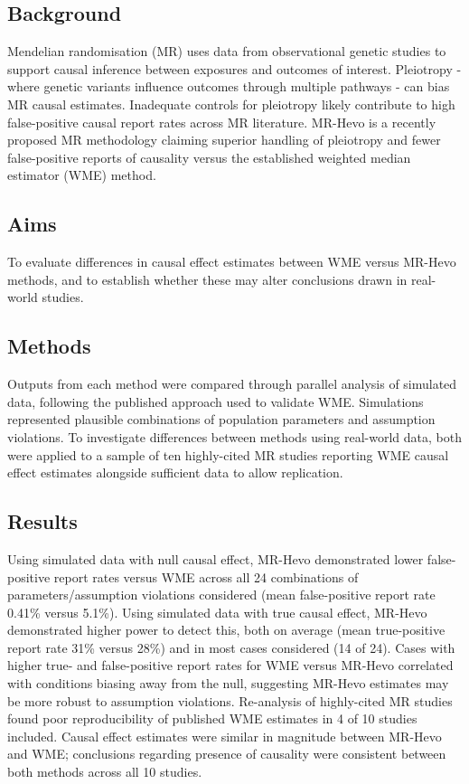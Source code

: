 \documentclass[
]{article}
\begin{document}
\subsection{Background}\label{background}

Mendelian randomisation (MR) uses data from observational genetic studies to support causal inference between exposures and outcomes of interest. Pleiotropy - where genetic variants influence outcomes through multiple pathways - can bias MR causal estimates. Inadequate controls for pleiotropy likely contribute to high false-positive causal report rates across MR literature. MR-Hevo is a recently proposed MR methodology claiming superior handling of pleiotropy and fewer false-positive reports of causality versus the established weighted median estimator (WME) method.

\subsection{Aims}\label{aims}

To evaluate differences in causal effect estimates between WME versus MR-Hevo methods, and to establish whether these may alter conclusions drawn in real-world studies.

\subsection{Methods}\label{methods}

Outputs from each method were compared through parallel analysis of simulated data, following the published approach used to validate WME. Simulations represented plausible combinations of population parameters and assumption violations. To investigate differences between methods using real-world data, both were applied to a sample of ten highly-cited MR studies reporting WME causal effect estimates alongside sufficient data to allow replication.

\subsection{Results}\label{results}

Using simulated data with null causal effect, MR-Hevo demonstrated lower false-positive report rates versus WME across all 24 combinations of parameters/assumption violations considered (mean false-positive report rate 0.41\% versus 5.1\%). Using simulated data with true causal effect, MR-Hevo demonstrated higher power to detect this, both on average (mean true-positive report rate 31\% versus 28\%) and in most cases considered (14 of 24). Cases with higher true- and false-positive report rates for WME versus MR-Hevo correlated with conditions biasing away from the null, suggesting MR-Hevo estimates may be more robust to assumption violations. Re-analysis of highly-cited MR studies found poor reproducibility of published WME estimates in 4 of 10 studies included. Causal effect estimates were similar in magnitude between MR-Hevo and WME; conclusions regarding presence of causality were consistent between both methods across all 10 studies.
\end{document}
